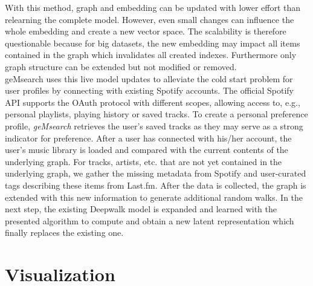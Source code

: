 \documentclass[sigconf]{acmart}
\begin{document}
With this method, graph and embedding can be updated with lower effort than relearning the complete model. However, even small changes can influence the whole embedding and create a new vector space. The scalability is therefore questionable because for big datasets, the new embedding may impact all items contained in the graph which invalidates all created indexes. Furthermore only graph structure can be extended but not modified or removed. \\



geMsearch uses this live model updates to alleviate the cold start problem for user profiles by connecting with existing Spotify accounts. The official Spotify API supports the OAuth protocol with different scopes, allowing access to, e.g., personal playlists, playing history or saved tracks. To create a personal preference profile, \emph{geMsearch} retrieves the user's saved tracks as they may serve as a strong indicator for preference. %
After a user has connected with his/her account, the user's music library is loaded and compared with the current contents of the underlying graph. For tracks, artists, etc. that are not yet contained in the underlying graph, we gather the missing metadata from Spotify and user-curated tags describing these items from Last.fm. After the data is collected, the graph is extended with this new information to generate additional random walks. In the next step, the existing Deepwalk model is expanded and learned with the presented algorithm to compute and obtain a new latent representation which finally replaces the existing one.

\section{Visualization}
\label{sec:viz_approach}
\end{document}
